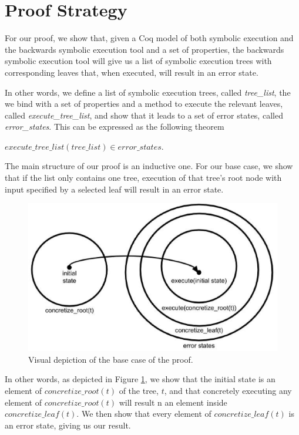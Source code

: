 \section{Proof Strategy}
For our proof, we show that, given a Coq model of both symbolic execution and the backwards symbolic execution tool and a set of properties, 
the backwards symbolic execution tool will give us a list of symbolic execution trees with corresponding leaves that, when executed, will result in an error state.

In other words, we define a list of symbolic execution trees, called \textit{tree\_list}, the we bind with a set of properties and a method to execute the relevant leaves, called \textit{execute\_tree\_list},
and show that it leads to a set of error states, called \textit{error\_states}. This can be expressed as the following theorem


\begin{theorem}
\label{thm:sufficiency}
$execute\_tree\_list (tree\_list) \in error\_states$.
\end{theorem}

The main structure of our proof is an inductive one. 
For our base case, we show that if the list only contains one tree, execution of that tree's root node with input specified by a selected leaf will result in an error state.

\begin{figure}
\includegraphics[width=\textwidth]{set3.eps}
\caption{Visual depiction of the base case of the proof.}
\label{fig:basecase}
\end{figure}

In other words, as depicted in Figure \ref{fig:basecase}, we show that the initial state is an element of $concretize\_root(t)$ of the tree, $t$, and that concretely executing any element of $concretize\_root(t)$ will result n an element inside $concretize\_leaf(t).$
We then show that every element of $concretize\_leaf(t)$ is an error state, giving us our result.


